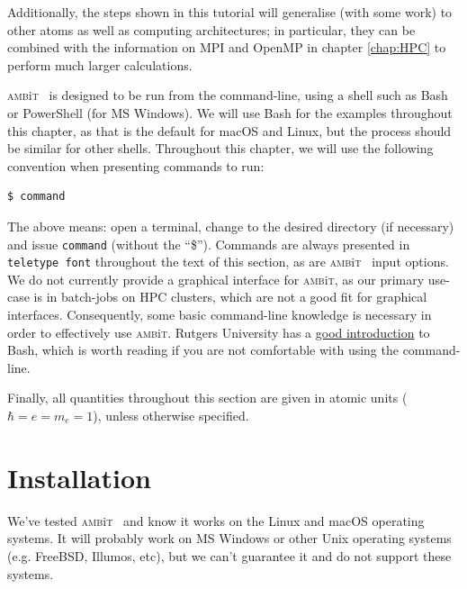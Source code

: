 \documentclass{report}
\newcommand{\ambit}{\textsc{amb}{\footnotesize i}\textsc{t}}
\begin{document}
Additionally, the steps shown in this tutorial will generalise
(with some work) to other atoms as well as computing architectures; in particular, they can be
combined with the information on MPI and OpenMP in chapter \ref{chap:HPC} to perform much larger
calculations.

\ambit~ is designed to be run from the command-line, using a shell such as Bash or PowerShell (for MS
Windows). We will
use Bash for the examples throughout this chapter, as that is the default for macOS and Linux, but the
process should be similar for other shells. Throughout this chapter, we will use the following
convention when presenting commands to run:

\begin{verbatim}
$ command
\end{verbatim}

The above means: open a terminal, change to the desired directory (if necessary) and issue
\texttt{command} (without the ``\$''). Commands are always presented in \texttt{teletype font}
throughout the text of this section, as are \ambit~ input options. We do not currently provide a 
graphical interface for \ambit, as our primary use-case is in batch-jobs on HPC clusters, which are not
a good fit for graphical interfaces. Consequently, some basic command-line knowledge is necessary in
order to effectively use \ambit. Rutgers University has a
\href{http://linuxcourse.rutgers.edu/documents/Bash-Beginners-Guide/}{good introduction} to Bash, which
is worth reading if you are not comfortable with using the command-line.

Finally, all quantities throughout this section are given in atomic units ($\hbar = e = m_e = 1$), 
unless otherwise specified.

\section{Installation}

We've tested \ambit~ and know it works on the Linux and macOS operating systems. It will probably work
on MS Windows or other Unix operating systems (e.g. FreeBSD, Illumos, etc), but we can't guarantee it
and do not support these systems. 
\end{document}
